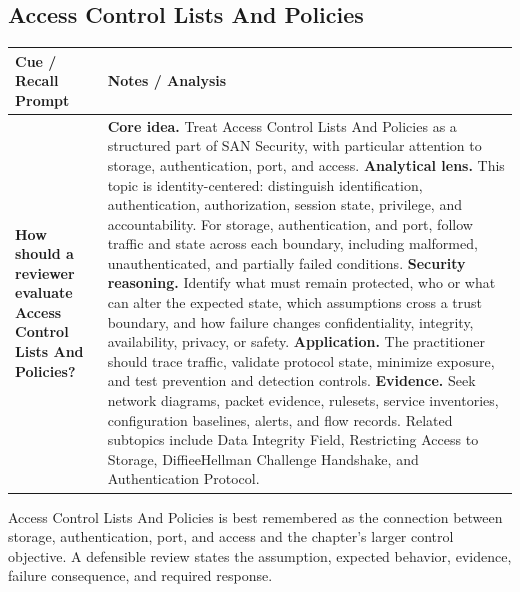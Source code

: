 \documentclass[11pt]{article}
\newcommand{\CornellHeader}{%
\rowcolor{Navy}\color{white}\bfseries Cue / Recall Prompt & \color{white}\bfseries Notes / Analysis\\\hline}
\newcommand{\CornellRow}[2]{%
\cellcolor{CueGray}\RaggedRight\textbf{#1} & \RaggedRight #2\\\hline}
\begin{document}
\subsection*{Access Control Lists And Policies}
\begin{longtable}{>{\RaggedRight\arraybackslash}p{}|>{\RaggedRight\arraybackslash}p{}}
\CornellHeader
\CornellRow{How should a reviewer evaluate Access Control Lists And Policies?}{\textbf{Core idea.} Treat Access Control Lists And Policies as a structured part of SAN Security, with particular attention to storage, authentication, port, and access. \textbf{Analytical lens.} This topic is identity-centered: distinguish identification, authentication, authorization, session state, privilege, and accountability. For storage, authentication, and port, follow traffic and state across each boundary, including malformed, unauthenticated, and partially failed conditions. \textbf{Security reasoning.} Identify what must remain protected, who or what can alter the expected state, which assumptions cross a trust boundary, and how failure changes confidentiality, integrity, availability, privacy, or safety. \textbf{Application.} The practitioner should trace traffic, validate protocol state, minimize exposure, and test prevention and detection controls. \textbf{Evidence.} Seek network diagrams, packet evidence, rulesets, service inventories, configuration baselines, alerts, and flow records. Related subtopics include Data Integrity Field, Restricting Access to Storage, DiffieeHellman Challenge Handshake, and Authentication Protocol.}
\end{longtable}
\begin{topicsummary}
Access Control Lists And Policies is best remembered as the connection between storage, authentication, port, and access and the chapter's larger control objective. A defensible review states the assumption, expected behavior, evidence, failure consequence, and required response.
\end{topicsummary}
\end{document}
